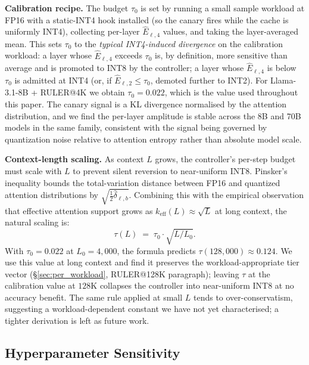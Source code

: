 \documentclass{article}
\begin{document}
\textbf{Calibration recipe.} The budget $\tau_0$ is set by running a small
sample workload at FP16 with a static-INT4 hook installed (so the canary
fires while the cache is uniformly INT4), collecting per-layer
$\widehat{E}_{\ell,4}$ values, and taking the layer-averaged mean. This
sets $\tau_0$ to the \emph{typical INT4-induced divergence} on the
calibration workload: a layer whose $\widehat{E}_{\ell,4}$ exceeds $\tau_0$
is, by definition, more sensitive than average and is promoted to INT8 by
the controller; a layer whose $\widehat{E}_{\ell,4}$ is below $\tau_0$ is
admitted at INT4 (or, if $\widehat{E}_{\ell,2} \le \tau_0$, demoted further
to INT2). For Llama-3.1-8B + RULER@4K we obtain $\tau_0 = 0.022$, which is
the value used throughout this paper. The canary signal is a KL divergence
normalised by the attention distribution, and we find the per-layer
amplitude is stable across the 8B and 70B models in the same family,
consistent with the signal being governed by quantization noise relative
to attention entropy rather than absolute model scale.

\textbf{Context-length scaling.} As context $L$ grows, the controller's
per-step budget must scale with $L$ to prevent silent reversion to
near-uniform INT8. Pinsker's inequality bounds the total-variation distance
between FP16 and quantized attention distributions by
$\sqrt{\tfrac{1}{2} \hat{\delta}_{\ell,b}}$. Combining this with the
empirical observation that effective attention support grows as
$k_{\mathrm{eff}}(L) \approx \sqrt{L}$ at long context, the natural
scaling is:
\begin{equation}
  \tau(L) \;=\; \tau_0 \cdot \sqrt{L / L_0}.
  \label{eq:tau_scaling}
\end{equation}
With $\tau_0{=}0.022$ at $L_0{=}4{,}000$, the formula predicts
$\tau(128{,}000) \approx 0.124$. We use this value at long context and
find it preserves the workload-appropriate tier vector
(\S\ref{sec:per_workload}, RULER@128K paragraph); leaving $\tau$ at the calibration value at $128$K
collapses the controller into near-uniform INT8 at no accuracy benefit.
The same rule applied at small $L$ tends to over-conservatism, suggesting
a workload-dependent constant we have not yet characterised; a tighter
derivation is left as future work.

\subsection{Hyperparameter Sensitivity}
\label{sec:ablation}
\end{document}
